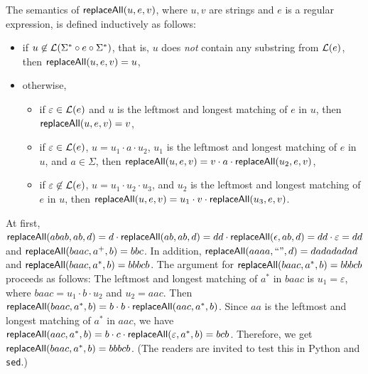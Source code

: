 \begin{definition} \label{def:replaceall}
The semantics of $\mathsf{replaceAll}(u, e, v)$, where $u, v$ are strings and $e$ is a regular expression, is defined inductively as follows:
\begin{itemize}
%	
%
	\item if $u \not \in \mathcal{L}(\Sigma^\ast \circ e \circ \Sigma^\ast)$, that is, $u$ does \emph{not} contain any substring from $\mathcal{L}(e)$, then $\mathsf{replaceAll}(u, e, v) = u$, 
	\item otherwise, 
	\begin{itemize}
	\item if $\varepsilon \in \mathcal{L}(e)$ and $u$ is the leftmost and longest matching of $e$ in $u$, then $\mathsf{replaceAll}(u, e, v) = v$,
	\item if $\varepsilon \in \mathcal{L}(e)$, $u = u_1 \cdot  a \cdot  u_2$, $u_1$ is the leftmost and longest matching of $e$ in $u$, and $a \in \Sigma$, then $\mathsf{replaceAll}(u, e, v) = v \cdot a \cdot \mathsf{replaceAll}(u_2, e, v)$,
	\item if $\varepsilon \not \in \mathcal{L}(e)$, $u = u_1\cdot  u_2\cdot  u_3$, and $u_2$ is the leftmost and longest matching of $e$ in $u$,  then 
$\mathsf{replaceAll}(u, e, v) = u_1 \cdot v \cdot \mathsf{replaceAll}(u_3, e, v)$. 
	\end{itemize}
\end{itemize}
\end{definition}



\begin{example}
	
At first, $\mathsf{replaceAll}(abab, ab, d) =d \cdot \mathsf{replaceAll}(ab, ab, d)= dd \cdot \mathsf{replaceAll}(\epsilon, ab, d)=dd \cdot \varepsilon = dd$ and $\mathsf{replaceAll}(baac, a^+, b)=bbc$. In addition, $\mathsf{replaceAll}(aaaa, ``", d) =dadadadad$ and $\mathsf{replaceAll}(baac, a^*, b) =bbbcb$.  The argument for $\mathsf{replaceAll}(baac, a^*, b) = bbbcb$ proceeds as follows: The leftmost and longest matching of $a^*$ in $baac$ is $u_1 =\varepsilon$, where $baac = u_1 \cdot b \cdot u_2$ and $u_2 = aac$. Then $\mathsf{replaceAll}(baac, a^*, b) = b \cdot b \cdot \mathsf{replaceAll}(aac, a^*, b)$. Since $aa$ is the leftmost and longest matching of $a^*$ in $aac$, we have $\mathsf{replaceAll}(aac, a^*, b) = b \cdot c \cdot \mathsf{replaceAll}(\varepsilon, a^*, b) = bcb$. Therefore, we get $\mathsf{replaceAll}(baac, a^*, b) = bbbcb$. (The readers are invited to test this in Python and \texttt{sed}.)


\end{example}

